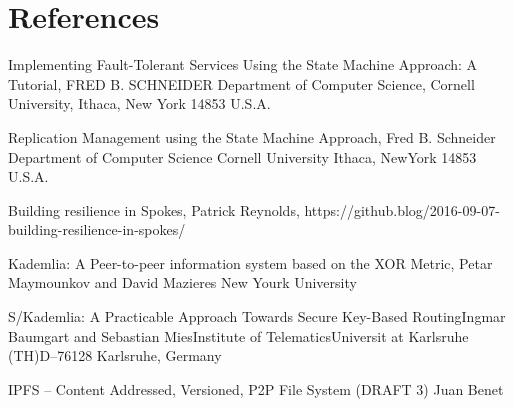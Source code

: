 \documentclass[acmlarge, screen, nonacm, 11pt]{acmart}
\begin{document}
% 

\section{References}
\label{ref:references}

Implementing Fault-Tolerant Services Using the State Machine Approach: A Tutorial, FRED B. SCHNEIDER Department of Computer Science, Cornell University, Ithaca, New York 14853 U.S.A.

Replication Management using the State Machine Approach, Fred B. Schneider Department of Computer Science Cornell University Ithaca, NewYork 14853 U.S.A.

Building resilience in Spokes, Patrick Reynolds, https://github.blog/2016-09-07-building-resilience-in-spokes/

Kademlia: A Peer-to-peer information system based on the XOR Metric, Petar Maymounkov and David Mazieres New Yourk University

S/Kademlia: A Practicable Approach Towards Secure Key-Based RoutingIngmar Baumgart and Sebastian MiesInstitute of TelematicsUniversit at Karlsruhe (TH)\@ D–76128 Karlsruhe, Germany

IPFS -- Content Addressed, Versioned, P2P File System (DRAFT 3) Juan Benet

\end{document}
